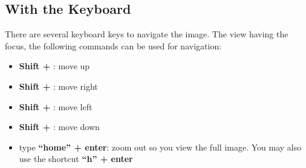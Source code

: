 \documentclass[12pt,a4paper,final]{report}
\begin{document}
\subsection{With the Keyboard}
  There are several keyboard  keys to navigate the image.
The view having the focus, the following commands can be used for navigation:
\begin{itemize}
 \item \textbf{Shift + \textuparrow}: move up
 \item \textbf{Shift + \textrightarrow}: move right
 \item \textbf{Shift + \textleftarrow}: move left
 \item \textbf{Shift + \textdownarrow}: move down
 \item type \textbf{``home'' + enter}: zoom out so you view the full image.
You may also use the shortcut \textbf{``h'' + enter}
\end{itemize}
\end{document}
